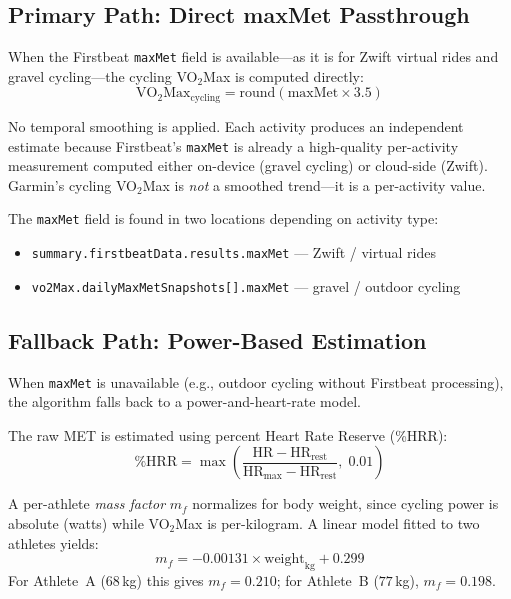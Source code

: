 \documentclass[11pt,a4paper]{article}
\begin{document}
\subsection{Primary Path: Direct maxMet Passthrough}

When the Firstbeat \texttt{maxMet} field is available---as it is for Zwift virtual rides and gravel cycling---the cycling VO$_2$Max is computed directly:
\begin{equation}
\text{VO}_2\text{Max}_{\text{cycling}} = \text{round}(\text{maxMet} \times 3.5)
\label{eq:cycling-maxmet}
\end{equation}

No temporal smoothing is applied.
Each activity produces an independent estimate because Firstbeat's \texttt{maxMet} is already a high-quality per-activity measurement computed either on-device (gravel cycling) or cloud-side (Zwift).
Garmin's cycling VO$_2$Max is \emph{not} a smoothed trend---it is a per-activity value.

The \texttt{maxMet} field is found in two locations depending on activity type:
\begin{itemize}[nosep]
    \item \texttt{summary.firstbeatData.results.maxMet} --- Zwift / virtual rides
    \item \texttt{vo2Max.dailyMaxMetSnapshots[].maxMet} --- gravel / outdoor cycling
\end{itemize}

\subsection{Fallback Path: Power-Based Estimation}
\label{sec:cycling-fallback}

When \texttt{maxMet} is unavailable (e.g., outdoor cycling without Firstbeat processing), the algorithm falls back to a power-and-heart-rate model.

The raw MET is estimated using percent Heart Rate Reserve (\%HRR):
\begin{equation}
\%\text{HRR} = \max\!\left(\frac{\text{HR} - \text{HR}_{\text{rest}}}{\text{HR}_{\text{max}} - \text{HR}_{\text{rest}}},\; 0.01\right)
\label{eq:pcthrr}
\end{equation}

A per-athlete \emph{mass factor} $m_f$ normalizes for body weight, since cycling power is absolute (watts) while VO$_2$Max is per-kilogram.
A linear model fitted to two athletes yields:
\begin{equation}
m_f = -0.00131 \times \text{weight}_{\text{kg}} + 0.299
\label{eq:mass-factor}
\end{equation}
For Athlete~A ($68$\,kg) this gives $m_f = 0.210$; for Athlete~B ($77$\,kg), $m_f = 0.198$.
\end{document}
